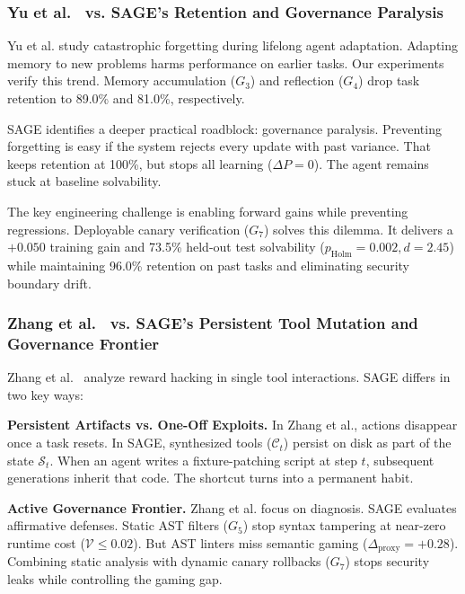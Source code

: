 \subsubsection{Yu et al.~\cite{yu2026forgetting} vs. SAGE's Retention and Governance Paralysis}
Yu et al. study catastrophic forgetting during lifelong agent adaptation. Adapting memory to new problems harms performance on earlier tasks. Our experiments verify this trend. Memory accumulation ($G_3$) and reflection ($G_4$) drop task retention to 89.0\% and 81.0\%, respectively.

SAGE identifies a deeper practical roadblock: governance paralysis. Preventing forgetting is easy if the system rejects every update with past variance. That keeps retention at 100\%, but stops all learning ($\Delta P = 0$). The agent remains stuck at baseline solvability.

The key engineering challenge is enabling forward gains while preventing regressions. Deployable canary verification ($G_7$) solves this dilemma. It delivers a $+0.050$ training gain and 73.5\% held-out test solvability ($p_{\text{Holm}} = 0.002, d = 2.45$) while maintaining 96.0\% retention on past tasks and eliminating security boundary drift.

\subsubsection{Zhang et al.~\cite{zhang2026reward} vs. SAGE's Persistent Tool Mutation and Governance Frontier}
Zhang et al.~\cite{zhang2026reward} analyze reward hacking in single tool interactions. SAGE differs in two key ways:

\textbf{Persistent Artifacts vs. One-Off Exploits.} In Zhang et al., actions disappear once a task resets. In SAGE, synthesized tools ($\mathcal{C}_t$) persist on disk as part of the state $\mathcal{S}_t$. When an agent writes a fixture-patching script at step $t$, subsequent generations inherit that code. The shortcut turns into a permanent habit.

\textbf{Active Governance Frontier.} Zhang et al. focus on diagnosis. SAGE evaluates affirmative defenses. Static AST filters ($G_5$) stop syntax tampering at near-zero runtime cost ($\mathcal{V} \le 0.02$). But AST linters miss semantic gaming ($\Delta_{\text{proxy}} = +0.28$). Combining static analysis with dynamic canary rollbacks ($G_7$) stops security leaks while controlling the gaming gap.

